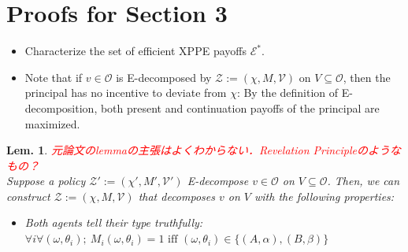 \documentclass[11pt,a4paper,dvipdfmx]{article}
\newtheorem{lem}{Lem.}
\newcommand{\mO}{\mathcal{O}}
\newcommand{\mV}{\mathcal{V}}
\newcommand{\mZ}{\mathcal{Z}}
\newcommand{\1}{\mathbbm{1}}
\newcommand{\ocomment}[1]{{\textcolor{red}{#1}}}
\begin{document}
\section*{Proofs for Section 3}
\begin{itemize}
	\item Characterize the set of efficient XPPE payoffs $\mathcal{E}^*$.
	\item Note that if $v \in \mO$ is E-decomposed by $\mZ := (\chi, M, \mV)$ on $V \subseteq \mO$, then the principal has no incentive to deviate from $\chi$: By the definition of E-decomposition, both present and continuation payoffs of the principal are maximized.
\end{itemize}
\begin{lem}
\ocomment{元論文のlemmaの主張はよくわからない．Revelation Principleのようなもの？}\\
Suppose a policy $\mZ' := (\chi', M', \mV')$ E-decompose $v \in \mO$ on $V \subseteq \mO$. Then, we can construct $\mZ:=(\chi, M, \mV)$ that decomposes $v$ on $V$ with the following properties:
\begin{itemize}
	\item Both agents tell their type truthfully: $\forall i \forall (\omega, \theta_i); \ M_i(\omega, \theta_i) = 1 \text{ iff } (\omega, \theta_i) \in \{(A, \alpha), (B, \beta)\}$
\end{itemize}
\end{lem}
\end{document}
